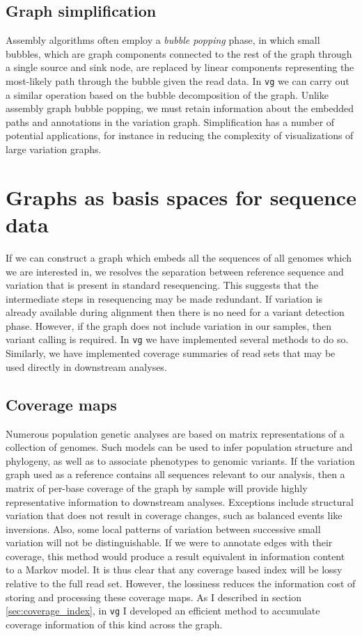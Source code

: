 \subsection{Graph simplification}

Assembly algorithms often employ a \emph{bubble popping} phase, in which small bubbles, which are graph components connected to the rest of the graph through a single source and sink node, are replaced by linear components representing the most-likely path through the bubble given the read data.
In {\tt vg} we can carry out a similar operation based on the bubble decomposition of the graph.
Unlike assembly graph bubble popping, we must retain information about the embedded paths and annotations in the variation graph.
Simplification has a number of potential applications, for instance in reducing the complexity of visualizations of large variation graphs.

\section{Graphs as basis spaces for sequence data}
\label{sec:basis_space}

If we can construct a graph which embeds all the sequences of all genomes which we are interested in, we resolves the separation between reference sequence and variation that is present in standard resequencing.
This suggests that the intermediate steps in resequencing may be made redundant.
If variation is already available during alignment then there is no need for a variant detection phase.
However, if the graph does not include variation in our samples, then variant calling is required.
In {\tt vg} we have implemented several methods to do so.
Similarly, we have implemented coverage summaries of read sets that may be used directly in downstream analyses.

\subsection{Coverage maps}

Numerous population genetic analyses are based on matrix representations of a collection of genomes.
Such models can be used to infer population structure and phylogeny, as well as to associate phenotypes to genomic variants.
If the variation graph used as a reference contains all sequences relevant to our analysis, then a matrix of per-base coverage of the graph by sample will provide highly representative information to downstream analyses.
Exceptions include structural variation that does not result in coverage changes, such as balanced events like inversions.
Also, some local patterns of variation between successive small variation will not be distinguishable.
If we were to annotate edges with their coverage, this method would produce a result equivalent in information content to a Markov model.
It is thus clear that any coverage based index will be lossy relative to the full read set.
However, the lossiness reduces the information cost of storing and processing these coverage maps.
As I described in section \ref{sec:coverage_index}, in {\tt vg} I developed an efficient method to accumulate coverage information of this kind across the graph.

